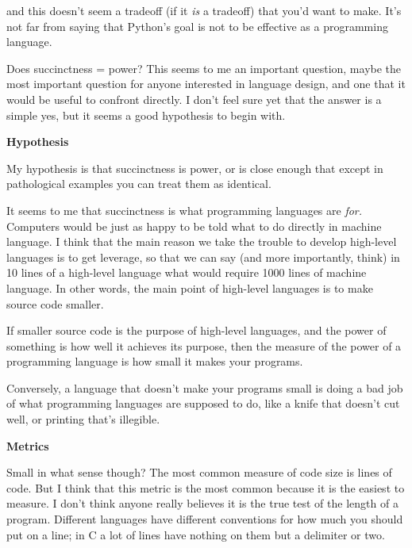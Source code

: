                   and this doesn't seem a tradeoff (if it \emph{is} a tradeoff)
                  that you'd want to make. It's not far from saying that
                  Python's goal is not to be effective as a programming
                  language.

Does succinctness = power? This seems to
                  me an important question, maybe the most important question
                  for anyone interested in language design, and one that it
                  would be useful to confront directly. I don't feel sure yet
                  that the answer is a simple yes, but it seems a good
                  hypothesis to begin with.

\textbf{Hypothesis}

My hypothesis is that succinctness is power, or
                  is close enough that except in pathological examples you can
                  treat them as identical.

It seems to me that
                  succinctness is what programming languages are
                  \emph{for.} Computers would be just as happy to be told what
                  to do directly in machine language. I think that the main
                  reason we take the trouble to develop high-level languages is
                  to get leverage, so that we can say (and more importantly,
                  think) in 10 lines of a high-level language what would require
                  1000 lines of machine language. In other words, the main point
                  of high-level languages is to make source code smaller.

If
                  smaller source code is the purpose of high-level languages,
                  and the power of something is how well it achieves its
                  purpose, then the measure of the power of a programming
                  language is how small it makes your programs.

Conversely,
                  a language that doesn't make your programs small is doing a
                  bad job of what programming languages are supposed to do, like
                  a knife that doesn't cut well, or printing that's illegible.
                  

\textbf{Metrics}

Small in what sense though? The most common
                  measure of code size is lines of code. But I think that this
                  metric is the most common because it is the easiest to
                  measure. I don't think anyone really believes it is the true
                  test of the length of a program. Different languages have
                  different conventions for how much you should put on a line;
                  in C a lot of lines have nothing on them but a delimiter or
                  two.

